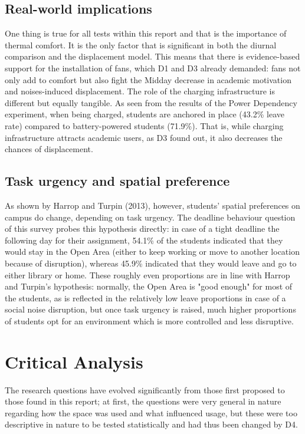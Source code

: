 \documentclass[12pt, a4paper]{report}
\begin{document}
\section{Real-world implications}
One thing is true for all tests within this report and that is the importance of thermal comfort. It is the only factor that is significant in both the diurnal comparison and the displacement model. This means that there is evidence-based support for the installation of fans, which D1 and D3 already demanded: fans not only add to comfort but also fight the Midday decrease in academic motivation and noises-induced displacement. The role of the charging infrastructure is different but equally tangible. As seen from the results of the Power Dependency experiment, when being charged, students are anchored in place (43.2\% leave rate) compared to battery-powered students (71.9\%). That is, while charging infrastructure attracts academic users, as D3 found out, it also decreases the chances of displacement.

\section{Task urgency and spatial preference}
As shown by Harrop and Turpin (2013), however, students' spatial preferences on campus do change, depending on task urgency. The deadline behaviour question of this survey probes this hypothesis directly: in case of a tight deadline the following day for their assignment, 54.1\% of the students indicated that they would stay in the Open Area (either to keep working or move to another location because of disruption), whereas 45.9\% indicated that they would leave and go to either library or home. These roughly even proportions are in line with Harrop and Turpin's hypothesis: normally, the Open Area is "good enough" for most of the students, as is reflected in the relatively low leave proportions in case of a social noise disruption, but once task urgency is raised, much higher proportions of students opt for an environment which is more controlled and less disruptive.

\chapter{Critical Analysis}

The research questions have evolved significantly from those first proposed to those found in this report; at first, the questions were very general in nature regarding how the space was used and what influenced usage, but these were too descriptive in nature to be tested statistically and had thus been changed by D4.
\end{document}
